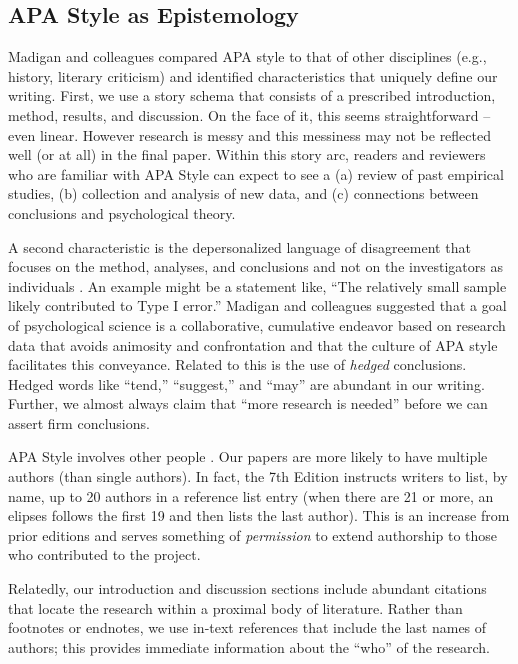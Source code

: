 \documentclass[
  11pt,
]{book}
\begin{document}
\hypertarget{apa-style-as-epistemology}{%
\subsection{APA Style as Epistemology}\label{apa-style-as-epistemology}}

Madigan \citeyearpar{madigan_language_1995} and colleagues compared APA style to that of other disciplines (e.g., history, literary criticism) and identified characteristics that uniquely define our writing. First, we use a story schema that consists of a prescribed introduction, method, results, and discussion. On the face of it, this seems straightforward -- even linear. However research is messy and this messiness may not be reflected well (or at all) in the final paper. Within this story arc, readers and reviewers who are familiar with APA Style can expect to see a (a) review of past empirical studies, (b) collection and analysis of new data, and (c) connections between conclusions and psychological theory.

A second characteristic is the depersonalized language of disagreement that focuses on the method, analyses, and conclusions and not on the investigators as individuals \citep{madigan_language_1995}. An example might be a statement like, ``The relatively small sample likely contributed to Type I error.'' Madigan and colleagues suggested that a goal of psychological science is a collaborative, cumulative endeavor based on research data that avoids animosity and confrontation and that the culture of APA style facilitates this conveyance. Related to this is the use of \emph{hedged} conclusions. Hedged words like ``tend,'' ``suggest,'' and ``may'' are abundant in our writing. Further, we almost always claim that ``more research is needed'' before we can assert firm conclusions.

APA Style involves other people \citep{madigan_language_1995}. Our papers are more likely to have multiple authors (than single authors). In fact, the 7th Edition instructs writers to list, by name, up to 20 authors in a reference list entry (when there are 21 or more, an elipses follows the first 19 and then lists the last author). This is an increase from prior editions and serves something of \emph{permission} to extend authorship to those who contributed to the project.

Relatedly, our introduction and discussion sections include abundant citations that locate the research within a proximal body of literature. Rather than footnotes or endnotes, we use in-text references that include the last names of authors; this provides immediate information about the ``who'' of the research.
\end{document}

